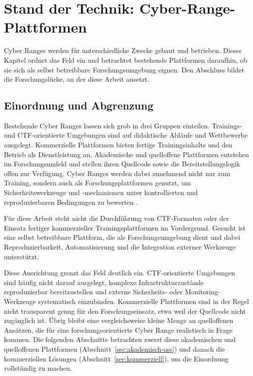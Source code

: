 \chapter{Stand der Technik: Cyber-Range-Plattformen}
\label{chap:stand-der-technik}

Cyber Ranges werden für unterschiedliche Zwecke gebaut und betrieben. Dieses Kapitel ordnet das
Feld ein und betrachtet bestehende Plattformen daraufhin, ob sie sich als selbst betreibbare
Forschungsumgebung eignen. Den Abschluss bildet die Forschungslücke, an der diese Arbeit ansetzt.

\section{Einordnung und Abgrenzung}
\label{sec:einordnung-abgrenzung}

Bestehende Cyber Ranges lassen sich grob in drei Gruppen einteilen. Trainings- und
CTF-orientierte Umgebungen sind auf didaktische Abläufe und Wettbewerbe ausgelegt. Kommerzielle
Plattformen bieten fertige Trainingsinhalte und den Betrieb als Dienstleistung an. Akademische und
quelloffene Plattformen entstehen im Forschungsumfeld und stellen ihren Quellcode sowie die
Bereitstellungslogik offen zur Verfügung. Cyber Ranges werden dabei zunehmend nicht nur zum
Training, sondern auch als Forschungsplattformen genutzt, um Sicherheitswerkzeuge und -mechanismen
unter kontrollierten und reproduzierbaren Bedingungen zu bewerten \cite{Chouliaras2021}.

Für diese Arbeit steht nicht die Durchführung von CTF-Formaten oder der Einsatz fertiger
kommerzieller Trainingsplattformen im Vordergrund. Gesucht ist eine selbst betreibbare Plattform,
die als Forschungsumgebung dient und dabei Reproduzierbarkeit, Automatisierung und die Integration
externer Werkzeuge unterstützt.

Diese Ausrichtung grenzt das Feld deutlich ein. CTF-orientierte Umgebungen sind häufig nicht darauf
ausgelegt, komplexe Infrastrukturzustände reproduzierbar bereitzustellen und externe Sicherheits-
oder Monitoring-Werkzeuge systematisch einzubinden. Kommerzielle Plattformen sind in der Regel
nicht transparent genug für den Forschungseinsatz, etwa weil der Quellcode nicht zugänglich ist.
Übrig bleibt eine vergleichsweise kleine Menge an quelloffenen Ansätzen, die für eine
forschungsorientierte Cyber Range realistisch in Frage kommen. Die folgenden Abschnitte betrachten
zuerst diese akademischen und quelloffenen Plattformen (Abschnitt~\ref{sec:akademisch-oss}) und
danach die kommerziellen Lösungen (Abschnitt~\ref{sec:kommerziell}), um die Einordnung vollständig
zu machen.

